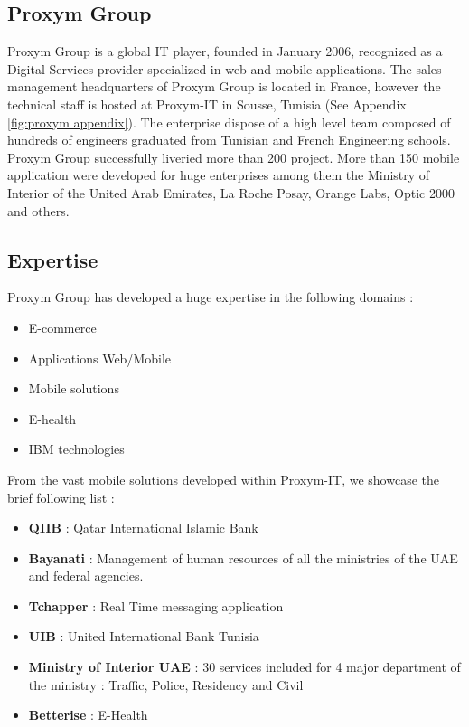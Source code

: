 \subsection{Proxym Group}
Proxym Group is a global IT player, founded in January 2006,  recognized as a Digital Services provider specialized in web and mobile applications. The sales management headquarters of Proxym Group is located in France, however the technical staff is hosted at Proxym-IT in Sousse, Tunisia (See Appendix \ref{fig:proxym appendix}). The enterprise dispose of a high level team composed of hundreds of engineers graduated from Tunisian and French Engineering schools. Proxym Group successfully liveried more than 200 project. More than 150 mobile application were developed for huge enterprises among them the Ministry of Interior of the United Arab Emirates, La Roche Posay, Orange Labs, Optic 2000 and others.


\subsection{Expertise}
Proxym Group has developed a huge expertise in the following domains :
\begin{itemize} 
\item E-commerce
\item Applications Web/Mobile
\item Mobile solutions
\item E-health 
\item IBM technologies
\end{itemize}
\newline
From the vast mobile solutions developed within Proxym-IT, we showcase the brief following list : 
\begin{itemize} 
\item \textbf{QIIB} : Qatar International Islamic Bank
\item \textbf{Bayanati} : Management of human resources of all the ministries of the UAE and federal agencies.
\item \textbf{Tchapper} : Real Time messaging application
\item \textbf{UIB} : United International Bank Tunisia
\item \textbf{Ministry of Interior UAE} : 30 services included for 4 major department of the ministry : Traffic, Police, Residency and Civil
\item \textbf{Betterise} : E-Health
\end{itemize}


